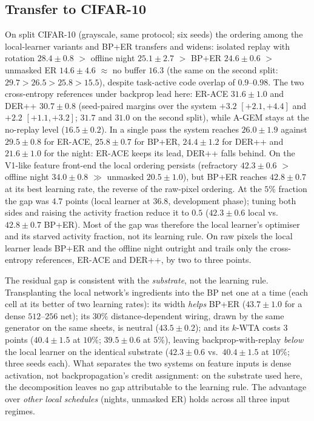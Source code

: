 \documentclass{article}
\newcommand{\kwta}{$k$-WTA}
\begin{document}
\subsection{Transfer to CIFAR-10}
On split CIFAR-10 (grayscale, same protocol; six seeds) the ordering among the
local-learner variants and BP+ER transfers and widens: isolated replay with rotation
$28.4\pm0.8$ $>$ offline night $25.1\pm2.7$ $>$ BP+ER $24.6\pm0.6$ $>$ unmasked ER
$14.6\pm4.6$ $\approx$ no buffer $16.3$ (the same on the second split:
$29.7>26.5>25.8>15.5$), despite task-active code overlap of $0.9$--$0.98$. The two
cross-entropy references under backprop lead here: ER-ACE $31.6\pm1.0$ and DER++
$30.7\pm0.8$ (seed-paired margins over the system $+3.2$ $[+2.1,+4.4]$ and $+2.2$
$[+1.1,+3.2]$; $31.7$ and $31.0$ on the second split), while A-GEM stays at the no-replay
level ($16.5\pm0.2$). In a single pass the system reaches $26.0\pm1.9$ against $29.5\pm0.8$
for ER-ACE, $25.8\pm0.7$ for BP+ER, $24.4\pm1.2$ for DER++ and $21.6\pm1.0$ for the night:
ER-ACE keeps its lead, DER++ falls behind. On the V1-like
feature front-end the local ordering persists (refractory $42.3\pm0.6$ $>$ offline night
$34.0\pm0.8$ $\gg$ unmasked $20.5\pm1.0$), but BP+ER reaches $42.8\pm0.7$ at its best
learning rate, the reverse of the raw-pixel ordering. At the $5\%$ fraction the gap was
$4.7$ points (local learner at $36.8$, development phase); tuning both sides and raising the
activity fraction reduce it to $0.5$ ($42.3\pm0.6$ local vs.\ $42.8\pm0.7$ BP+ER). Most of
the gap was therefore the local learner's optimiser and its starved activity fraction, not
its learning rule. On raw pixels the local learner leads BP+ER and the offline night
outright and trails only the cross-entropy references, ER-ACE and DER++, by two to three
points.

The residual gap is consistent with the \emph{substrate}, not the learning rule.
Transplanting the local network's ingredients into the BP net one at a time (each cell at its
better of two learning rates): its width \emph{helps} BP+ER ($43.7\pm1.0$ for a dense
$512$--$256$ net); its $30\%$ distance-dependent wiring, drawn by the same generator on the
same sheets, is neutral ($43.5\pm0.2$); and its \kwta{} costs $3$ points ($40.4\pm1.5$ at
$10\%$; $39.5\pm0.6$ at $5\%$), leaving backprop-with-replay \emph{below} the local learner
on the identical substrate ($42.3\pm0.6$ vs.\ $40.4\pm1.5$ at $10\%$; three seeds each).
What separates the two systems on feature inputs is dense activation, not backpropagation's
credit assignment: on the substrate used here, the decomposition leaves no gap attributable
to the learning rule. The advantage over \emph{other local schedules} (nights, unmasked ER)
holds across all three input regimes.
\end{document}

